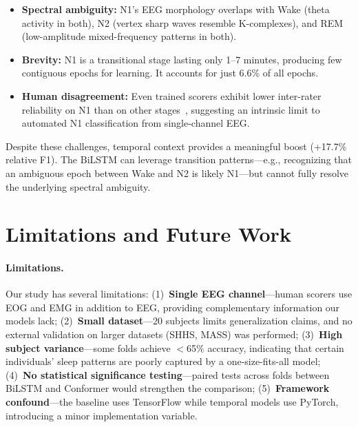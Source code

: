 \documentclass[final]{article}
\begin{document}
\begin{itemize}[nosep, leftmargin=*]
  \item \textbf{Spectral ambiguity:} N1's EEG morphology overlaps with Wake (theta activity in both), N2 (vertex sharp waves resemble K-complexes), and REM (low-amplitude mixed-frequency patterns in both).
  \item \textbf{Brevity:} N1 is a transitional stage lasting only 1--7 minutes, producing few contiguous epochs for learning. It accounts for just 6.6\% of all epochs.
  \item \textbf{Human disagreement:} Even trained scorers exhibit lower inter-rater reliability on N1 than on other stages~\cite{Rosenberg2013}, suggesting an intrinsic limit to automated N1 classification from single-channel EEG.
\end{itemize}

Despite these challenges, temporal context provides a meaningful boost (+17.7\% relative F1). The BiLSTM can leverage transition patterns---e.g., recognizing that an ambiguous epoch between Wake and N2 is likely N1---but cannot fully resolve the underlying spectral ambiguity.

\section{Limitations and Future Work}

\paragraph{Limitations.}
Our study has several limitations: (1)~\textbf{Single EEG channel}---human scorers use EOG and EMG in addition to EEG, providing complementary information our models lack; (2)~\textbf{Small dataset}---20 subjects limits generalization claims, and no external validation on larger datasets (SHHS, MASS) was performed; (3)~\textbf{High subject variance}---some folds achieve $<$65\% accuracy, indicating that certain individuals' sleep patterns are poorly captured by a one-size-fits-all model; (4)~\textbf{No statistical significance testing}---paired tests across folds between BiLSTM and Conformer would strengthen the comparison; (5)~\textbf{Framework confound}---the baseline uses TensorFlow while temporal models use PyTorch, introducing a minor implementation variable.
\end{document}
